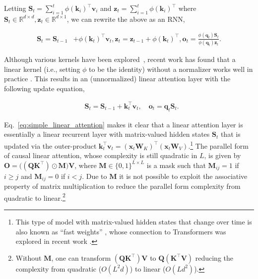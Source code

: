 Letting ${\mathbf{S}}_t=\sum_{i=1}^{t}\phi({\bm{k}}_i)^\intercal {\bm{v}}_i$ and ${\bm{z}}_t=\sum_{i=1}^{t}\phi({\bm{k}}_i)^\intercal$ where ${\mathbf{S}}_t \in \mathbb{R}^{d\times d}, {\bm{z}}_t \in \mathbb{R}^{d\times 1}$, we can rewrite the above as an RNN,

\begin{align*}
{\mathbf{S}}_t = {\mathbf{S}}_{t-1} &+ \phi({\bm{k}}_t)^\intercal {\bm{v}}_t,  {\bm{z}}_t = {\bm{z}}_{t-1} + \phi({\bm{k}}_t)^\intercal,  {\bm{o}}_t = \frac{\phi({\bm{q}}_t) {\mathbf{S}}_t}{ \phi({\bm{q}}_t) {\bm{z}}_t}.
\end{align*}

 Although various kernels have been explored~\citep{kasai-etal-2021-finetuning,peng2021random}, recent work has found that a linear kernel (i.e., setting $\phi$ to be the identity) without a normalizer  works well in practice \cite{sun2023retentive}. This results in an (unnormalized) linear attention layer with the following update equation,

\begin{align}
& {\mathbf{S}}_t = {\mathbf{S}}_{t-1} + {\bm{k}}_t^\intercal {\bm{v}}_t, \quad {\bm{o}}_t = {\bm{q}}_t {\mathbf{S}}_t   .
\label{eq:simple_linear_attention}
\end{align}

Eq.~\ref{eq:simple_linear_attention} makes it clear that  a linear attention layer is essentially a linear recurrent layer with matrix-valued hidden states ${\mathbf{S}}_t$ that is updated via the outer-product ${\bm{k}}_t^\intercal{\bm{v}}_t = ({\bm{x}}_t {\bm{W}}_K)^\intercal ({\bm{x}}_t {\bm{W}}_V)$.\footnote{This type of model with matrix-valued hidden states that change over time is also known as ``fast weights'' \citep{hinton1987using,schmidhuber1992learning,ba2016using}, whose connection to Transformers was  explored in recent work \citep{linear-xmr-fastweight,irie2021going,mao-2022-fine}.} The parallel form of causal linear attention, whose complexity is still quadratic in $L$, is given by
${\mathbf{O}} = \big(({\mathbf{Q}} {\mathbf{K}}^\intercal) \odot {\mathbf{M}} \big){\mathbf{V}}$,
where ${\mathbf{M}} \in \{0,1\}^{L \times L}$ is a mask such that ${\mathbf{M}}_{ij}=1$ if $i\ge j$ and ${\mathbf{M}}_{ij}=0$ if $i<j$. Due to ${\mathbf{M}}$ it is not possible to exploit the associative property of matrix multiplication to reduce the parallel form complexity from quadratic to linear.\footnote{Without ${\mathbf{M}}$, one can transform $({\mathbf{Q}} {\mathbf{K}}^\intercal){\mathbf{V}}$ to ${\mathbf{Q}}( {\mathbf{K}}^\intercal{\mathbf{V}})$ reducing the complexity from quadratic ($O(L^2d)$) to linear ($O(Ld^2)$).}

